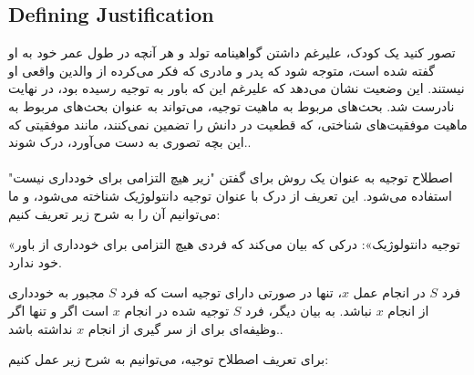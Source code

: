 \documentclass[10pt,a4paper]{article}
\begin{document}
                    \subsection{Defining Justification}
                   تصور کنید یک کودک، علیرغم داشتن گواهینامه تولد و هر آنچه در طول عمر خود به او گفته شده است، متوجه شود که پدر و مادری که فکر می‌کرده از والدین واقعی او نیستند. این وضعیت نشان می‌دهد که علیرغم این که باور به توجیه رسیده بود، در نهایت نادرست شد. بحث‌های مربوط به ماهیت توجیه، می‌تواند به عنوان بحث‌های مربوط به ماهیت موفقیت‌های شناختی، که قطعیت در دانش را تضمین نمی‌کنند، مانند موفقیتی که این بچه تصوری به دست می‌آورد، درک شوند..
                    \\
                    \\
                    اصطلاح توجیه به عنوان یک روش برای گفتن "زیر هیچ التزامی برای خودداری نیست" استفاده می‌شود. این تعریف از درک با عنوان توجیه دانتولوژیک شناخته می‌شود، و ما می‌توانیم آن را به شرح زیر تعریف کنیم:

«توجیه دانتولوژیک»: درکی که بیان می‌کند که فردی هیچ التزامی برای خودداری از باور خود ندارد.
                    \begin{define}
                        فرد $S$ در انجام عمل $x$، تنها در صورتی دارای توجیه است که فرد $S$ مجبور به خودداری از انجام $x$ نباشد. به بیان دیگر، فرد $S$ توجیه شده در انجام $x$ است اگر و تنها اگر وظیفه‌ای برای از سر گیری از انجام $x$ نداشته باشد..
                    \end{define}
                    برای تعریف اصطلاح توجیه، می‌توانیم به شرح زیر عمل کنیم:
\end{document}
